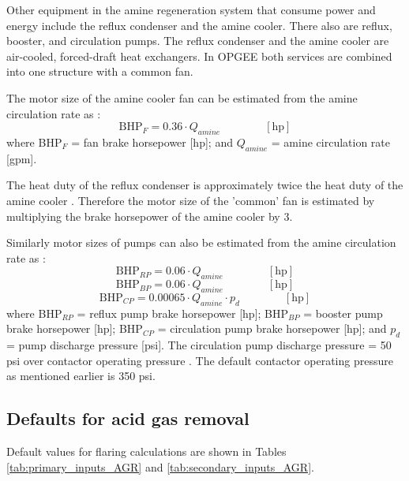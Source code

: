 \documentclass[11pt]{report}
\newcommand{\eqnunit}[1]{\quad\quad \scriptstyle{\left[\text{#1}\right]}}
\begin{document}
Other equipment in the amine regeneration system that consume power and energy include the reflux condenser and the amine cooler. There also are reflux, booster, and circulation pumps. The reflux condenser and the amine cooler are air-cooled, forced-draft heat exchangers. In OPGEE both services are combined into one structure with a common fan.

The motor size of the amine cooler fan can be estimated from the amine circulation rate as \cite[p. 118]{Manning1991}:
\begin{equation} \label{eq:BHP_fan}
\text{BHP}_{F} = 0.36\cdot Q_{amine}    \quad\quad\eqnunit{hp}
\end{equation}
where BHP$_{F}$ = fan brake horsepower [hp]; and  $Q_{amine}$ = amine circulation rate [gpm].

The heat duty of the reflux condenser is approximately twice the heat duty of the amine cooler \cite[p. 117]{Manning1991}. Therefore the motor size of the 'common' fan is estimated by multiplying the brake horsepower of the amine cooler by 3.

Similarly motor sizes of pumps can also be estimated from the amine circulation rate as \cite[p. 118]{Manning1991}: 
\begin{equation} \label{eq:BHP_reflux}
\text{BHP}_{RP}= 0.06 \cdot Q_{amine}    \quad\quad\eqnunit{hp}
\end{equation}
\begin{equation} \label{eq:BHP_booster}
\text{BHP}_{BP}= 0.06 \cdot Q_{amine}    \quad\quad\eqnunit{hp}
\end{equation}
\begin{equation} \label{eq:BHP_circulation}
\text{BHP}_{CP}=0.00065 \cdot Q_{amine} \cdot p_{d}   \quad\quad\eqnunit{hp}
\end{equation}
where BHP$_{RP}$ = reflux pump brake horsepower [hp]; BHP$_{BP}$ = booster pump brake horsepower [hp];  BHP$_{CP}$ = circulation pump brake horsepower [hp]; and $p_{d}$ = pump discharge pressure [psi]. The circulation pump discharge pressure = 50 psi over contactor operating pressure \cite[p. 121]{Manning1991}. The default contactor operating pressure as mentioned earlier is 350 psi. 

\subsection{Defaults for acid gas removal}

Default values for flaring calculations are shown in Tables \ref{tab:primary_inputs_AGR} and \ref{tab:secondary_inputs_AGR}.
\end{document}
